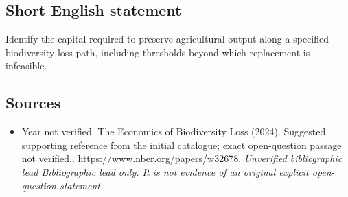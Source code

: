 \documentclass[11pt]{article}
\begin{document}
\subsection{Short English statement}
Identify the capital required to preserve agricultural output along a specified biodiversity-loss path, including thresholds beyond which replacement is infeasible.

\subsection{Sources}
\begin{itemize}\raggedright
\item[\textnormal{[S1]}]\hypertarget{source:30007718:1}{} Year not verified. The Economics of Biodiversity Loss (2024). Suggested supporting reference from the initial catalogue; exact open-question passage not verified..
\url{https://www.nber.org/papers/w32678}.
{\small\textit{Unverified bibliographic lead Bibliographic lead only. It is not evidence of an original explicit open-question statement.}}
\end{itemize}
\end{document}
